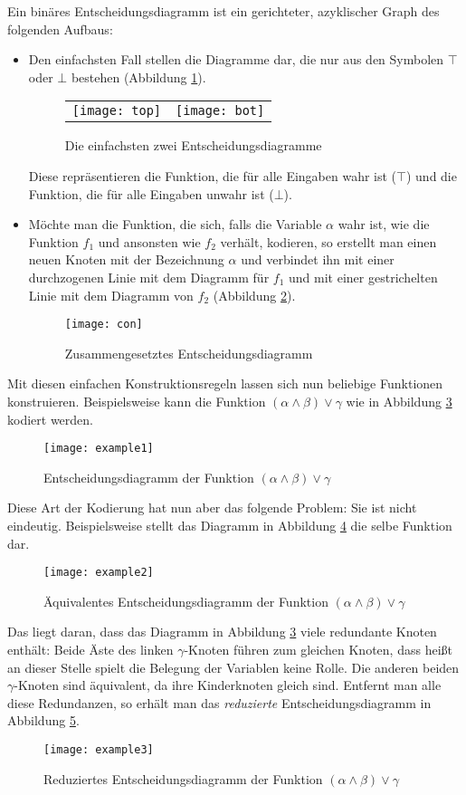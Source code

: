 Ein binäres Entscheidungsdiagramm ist ein gerichteter, azyklischer Graph des folgenden Aufbaus:
\begin{itemize}
\item Den einfachsten Fall stellen die Diagramme dar, die nur aus den Symbolen $\top$ oder $\bot$ bestehen (Abbildung \ref{fig:easy_bdd}).
  \begin{figure}[!h]
    \centering
    \begin{tabular}{cc}
      \texttt{[image: top]} & \texttt{[image: bot]}
    \end{tabular}
    \caption{Die einfachsten zwei Entscheidungsdiagramme}
    \label{fig:easy_bdd}
  \end{figure}
  Diese repräsentieren die Funktion, die für alle Eingaben wahr ist ($\top$) und die Funktion, die für alle Eingaben unwahr ist ($\bot$).
\item Möchte man die Funktion, die sich, falls die Variable $\alpha$ wahr ist, wie die Funktion $f_1$ und ansonsten wie $f_2$ verhält, kodieren, so erstellt man einen neuen Knoten mit der Bezeichnung $\alpha$ und verbindet ihn mit einer durchzogenen Linie mit dem Diagramm für $f_1$ und mit einer gestrichelten Linie mit dem Diagramm von $f_2$ (Abbildung \ref{fig:con_bdd}).
  \begin{figure}[!h]
    \centering
    \texttt{[image: con]}
    \caption{Zusammengesetztes Entscheidungsdiagramm}
    \label{fig:con_bdd}
  \end{figure}
\end{itemize}
Mit diesen einfachen Konstruktionsregeln lassen sich nun beliebige Funktionen konstruieren.
Beispielsweise kann die Funktion $(\alpha\land\beta)\lor \gamma$ wie in Abbildung \ref{fig:example1_bdd} kodiert werden.
\begin{figure}[h]
  \centering
  \texttt{[image: example1]}
  \caption{Entscheidungsdiagramm der Funktion $(\alpha\land\beta)\lor \gamma$}
  \label{fig:example1_bdd}
\end{figure}
Diese Art der Kodierung hat nun aber das folgende Problem: Sie ist nicht eindeutig.
Beispielsweise stellt das Diagramm in Abbildung \ref{fig:example2_bdd} die selbe Funktion dar.
\begin{figure}[h]
  \centering
  \texttt{[image: example2]}
  \caption{Äquivalentes Entscheidungsdiagramm der Funktion $(\alpha\land\beta)\lor \gamma$}
  \label{fig:example2_bdd}
\end{figure}
Das liegt daran, dass das Diagramm in Abbildung \ref{fig:example1_bdd} viele redundante Knoten enthält:
Beide Äste des linken $\gamma$-Knoten führen zum gleichen Knoten, dass heißt an dieser Stelle spielt die Belegung der Variablen keine Rolle.
Die anderen beiden $\gamma$-Knoten sind äquivalent, da ihre Kinderknoten gleich sind.
Entfernt man alle diese Redundanzen, so erhält man das \emph{reduzierte} Entscheidungsdiagramm in Abbildung \ref{fig:example3_bdd}.
\begin{figure}[h]
  \centering
  \texttt{[image: example3]}
  \caption{Reduziertes Entscheidungsdiagramm der Funktion $(\alpha\land\beta)\lor \gamma$}
  \label{fig:example3_bdd}
\end{figure}

